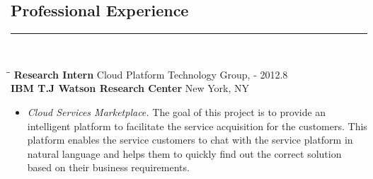 \documentclass{res}
\begin{document}
\begin{resume}
\section{\bfseries\Large Professional Experience}
\hspace{-0.5in}\rule{16.8cm}{0.4pt}\\[-0.9cm]
\vspace{-5pt}

    \begin{tabbing}
   \hspace{1.6in}\= \hspace{3.3in}\= \kill %
    {\bf Research Intern} \> Cloud Platform Technology Group,    - 2012.8\\
                            \>\textbf {IBM T.J Watson Research Center}        \>New York, NY\\
   \end{tabbing}      %
   \begin{itemize}
   \vspace{-5pt}
    \item \emph{Cloud Services Marketplace.}
    The goal of this project is to provide an intelligent platform to facilitate the service acquisition for the customers. This platform enables the service customers to chat with the service platform in natural language and helps them to quickly find out the correct solution based on their business requirements.
   \end{itemize}\vspace{-10pt}



\end{resume}
\end{document}
